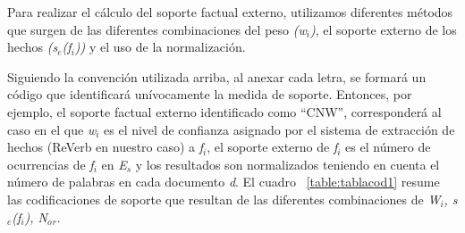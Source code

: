 Para realizar el c\'alculo del soporte factual externo, utilizamos diferentes m\'etodos que surgen de las diferentes combinaciones del peso \emph{(w${_i}$)}, el soporte externo de los hechos \emph{(s${_e}$(f${_i}$))} y el uso de la normalizaci\'on.

Siguiendo la convenci\'on utilizada arriba, al anexar cada letra, se formar\'a un c\'odigo que identificar\'a un\'ivocamente la medida de soporte.
Entonces, por ejemplo, el soporte factual externo identificado como “CNW”, corresponder\'a al caso en el que \emph{w${_i}$} es el nivel de confianza asignado por el sistema de extracci\'on de hechos (ReVerb en nuestro caso) a \emph{f${_i}$}, el soporte externo de \emph{f${_i}$} es el n\'umero de ocurrencias de \emph{f${_i}$} en \emph{E${_s}$} y los resultados son normalizados teniendo en cuenta el n\'umero de palabras en cada documento \emph{d}. El  cuadro ~\ref{table:tablacod1} resume las codificaciones de soporte que resultan de las diferentes combinaciones de \emph{W${_i}$, s${_e}$(f${_i}$), N${_o}$${_r}$}.	

